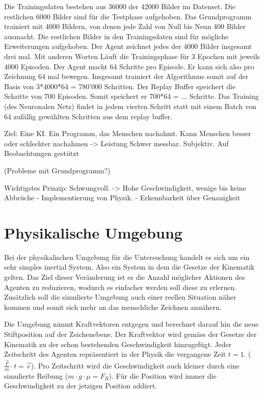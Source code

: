 Die Trainingsdaten bestehen aus 36000 der 42000 Bilder im Datenset. Die
restlichen 6000 Bilder sind für die Testphase aufgehoben. Das Grundprogramm
trainiert mit 4000 Bildern, von denen jede Zahl von Null bis Neun 400 Bilder
ausmacht. Die restlichen Bilder in den Trainingsdaten sind für mögliche
Erweiterungen aufgehoben. Der Agent zeichnet jedes der 4000 Bilder insgesamt
drei mal. Mit anderen Worten Läuft die Trainingsphase für 3 Epochen mit jeweils
4000 Episoden. Der Agent macht 64 Schritte pro Episode. Er kann sich also pro
Zeichnung 64 mal bewegen. Insgesamt trainiert der Algorithmus somit auf der
Basis von 3*4000*64 = 780'000 Schritten. Der Replay Buffer speichert die
Schritte von 700 Episoden. Somit speichert er 700*64 = ... Schritte. Das
Training (des Neuronalen Netz) findet in jedem vierten Schritt statt mit einem
Batch von 64 zufällig gewählten Schritten aus dem replay buffer. 










Ziel: Eine KI. Ein Programm, das Menschen nachahmt. 
Kann Menschen besser oder schlechter nachahmen -> Leistung
Schwer messbar. Subjektiv. Auf Beobachtungen gestützt

    (Probleme mit Grundprogramm?)
    
    Wichtigstes Prinzip: Schwungvoll. -> Hohe Geschwindigkeit, wenige bis keine Abbrüche
        - Implementierung von Physik. 
        - Erkennbarkeit über Genauigkeit


\section{Physikalische Umgebung}
Bei der physikalischen Umgebung für die Untersuchung handelt es sich um ein sehr
simples inertial System. Also ein System in dem die Gesetze der Kinematik
gelten. Das Ziel dieser Veränderung ist es die Anzahl möglicher Aktionen des
Agenten zu reduzieren, wodurch es einfacher werden soll diese zu erlernen.
Zusätzlich soll die simulierte Umgebung auch einer reellen Situation näher
kommen und somit sich mehr an das menschliche Zeichnen annähern.

Die Umgebung nimmt Kraftvektoren entgegen und berechnet darauf hin die neue
Stiftposition auf der Zeichenebene. Der Kraftvektor wird gemäss der Gesetze der
Kinematik zu der schon bestehenden Geschwindigkeit hinzugefügt. Jeder
Zeitschritt des Agenten repräsentiert in der Physik die vergangene Zeit $t=1$.
($\frac{\vec{F}}{m}\cdot t=\vec{v}$). Pro Zeitschritt wird die Geschwindigkeit
auch kleiner durch eine simulierte Reibung ($m\cdot g \cdot \mu = F_R$). Für die
Position wird immer die Geschwindigkeit zu der jetzigen Position addiert.

